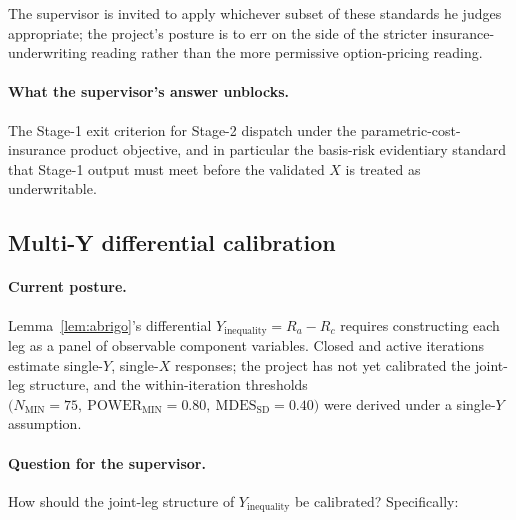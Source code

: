 The supervisor is invited to apply whichever subset of these standards he
judges appropriate; the project's posture is to err on the side of the
stricter insurance-underwriting reading rather than the more permissive
option-pricing reading.

\paragraph{What the supervisor's answer unblocks.} The Stage-1 exit
criterion for Stage-2 dispatch under the parametric-cost-insurance
product objective, and in particular the basis-risk evidentiary standard
that Stage-1 output must meet before the validated \(X\) is treated as
underwritable.

\subsection{Multi-Y differential calibration}\label{sec:7.3}

\paragraph{Current posture.} Lemma~\ref{lem:abrigo}'s differential
\(Y_{\text{inequality}} = R_a - R_c\) requires constructing each leg as a
panel of observable component variables. Closed and active iterations
estimate single-\(Y\), single-\(X\) responses; the project has not yet
calibrated the joint-leg structure, and the within-iteration thresholds
\(\big(N_{\text{MIN}} = 75,\ \mathrm{POWER}_{\text{MIN}} = 0.80,\
\mathrm{MDES}_{\text{SD}} = 0.40\big)\) were derived under a single-\(Y\)
assumption.

\paragraph{Question for the supervisor.} How should the joint-leg
structure of \(Y_{\text{inequality}}\) be calibrated? Specifically:


